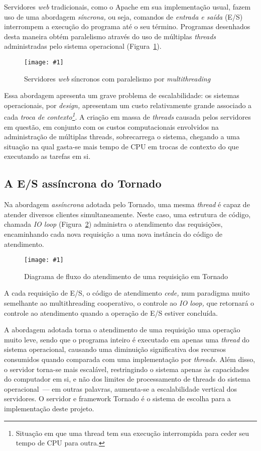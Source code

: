 \documentclass[ruledheader, 12pt]{abnt}
\newcommand{\figcustom}[4]{\par
	\begin{figure}[#3]
		\centering
		\texttt{[image: \#1]}
		\caption{\label{fig:#1}#2}
	\end{figure}
\par}
\newcommand{\fig}[2]{\figcustom{#1}{#2}{bp}{1}}
\newcommand{\figref}[1]{(Figura~\ref{fig:#1})}
\begin{document}
Servidores \emph{web} tradicionais, como o Apache em sua implementação usual, fazem uso de uma abordagem \emph{síncrona,} ou seja, comandos de \emph{entrada e saída} (E/S) interrompem a execução do programa até o seu término. Programas desenhados desta maneira obtém paralelismo através do uso de múltiplas \emph{threads} administradas pelo sistema operacional \figref{multithreaded-webservers}.

\figcustom{multithreaded-webservers}{Servidores \emph{web} síncronos com paralelismo por \emph{multithreading}}{bp}{.9}

Essa abordagem apresenta um grave problema de escalabilidade: os sistemas operacionais, por \emph{design,} apresentam um custo relativamente grande associado a cada \emph{troca de contexto\footnote{Situação em que uma thread tem sua execução interrompida para ceder seu tempo de CPU para outra.}}. A criação em massa de \emph{threads} causada pelos servidores em questão, em conjunto com os custos computacionais envolvidos na administração de múltiplas threads, sobrecarrega o sistema, chegando a uma situação na qual gasta-se mais tempo de CPU em trocas de contexto do que executando as tarefas em si.

\subsection{A E/S assíncrona do Tornado}

Na abordagem \emph{assíncrona} adotada pelo Tornado, uma mesma \emph{thread} é capaz de atender diversos clientes simultaneamente. Neste caso, uma estrutura de código, chamada \emph{IO loop} \figref{tornado-ioloop} administra o atendimento das requisições, encaminhando cada nova requisição a uma nova instância do código de atendimento.

\fig{tornado-ioloop}{Diagrama de fluxo do atendimento de uma requisição em Tornado}

A cada requisição de E/S, o código de atendimento \emph{cede,} num paradigma muito semelhante ao multithreading cooperativo, o controle ao \emph{IO loop,} que retornará o controle ao atendimento quando a operação de E/S estiver concluída.

A abordagem adotada torna o atendimento de uma requisição uma operação muito leve, sendo que o programa inteiro é executado em apenas uma \emph{thread} do sistema operacional, causando uma diminuição significativa dos recursos consumidos quando comparada com uma implementação por \emph{threads.} Além disso, o servidor torna-se mais escalável, restringindo o sistema apenas às capacidades do computador em si, e não dos limites de processamento de threads do sistema operacional~--- em outras palavras, aumenta-se a escalabilidade vertical dos servidores. O servidor e framework Tornado é o sistema de escolha para a implementação deste projeto.
\end{document}
